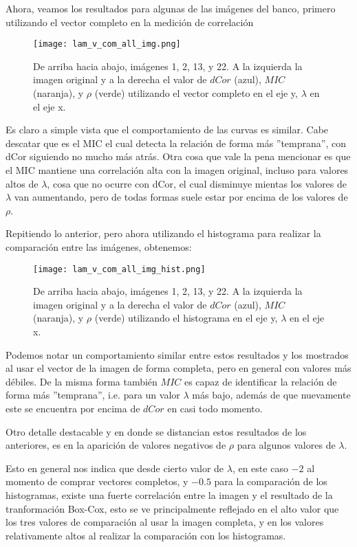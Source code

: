     Ahora, veamos los resultados para algunas de las im\'agenes del banco, primero utilizando el vector completo en la medici\'on de correlaci\'on  

    \begin{figure}[H]
        \centering
        \texttt{[image: lam\_v\_com\_all\_img.png]}
        \caption{De arriba hacia abajo, im\'agenes 1, 2, 13, y 22. A la izquierda la imagen original y a la derecha el valor de $dCor$ (azul), $MIC$ (naranja), y $\rho$ (verde) utilizando el vector completo en el eje y, $\lambda$ en el eje x.}
    \end{figure}


    Es claro a simple vista que el comportamiento de las curvas es similar. Cabe descatar que es el MIC el cual detecta la relaci\'on de forma m\'as ''temprana'', con dCor siguiendo no mucho m\'as atr\'as. Otra cosa que vale la pena mencionar es que el MIC mantiene una correlaci\'on alta con la imagen original, incluso para valores altos de $\lambda$, cosa que no ocurre con dCor, el cual disminuye mientas los valores de $\lambda$ van aumentando, pero de todas formas suele estar por encima de los valores de $\rho$.

    Repitiendo lo anterior, pero ahora utilizando el histograma para realizar la comparaci\'on entre las im\'agenes, obtenemos:

    \begin{figure}[H]
        \centering
        \texttt{[image: lam\_v\_com\_all\_img\_hist.png]}
        \caption{De arriba hacia abajo, im\'agenes 1, 2, 13, y 22. A la izquierda la imagen original y a la derecha el valor de $dCor$ (azul), $MIC$ (naranja), y $\rho$ (verde) utilizando el histograma en el eje y, $\lambda$ en el eje x.}
    \end{figure}

        Podemos notar un comportamiento similar entre estos resultados y los mostrados al usar el vector de la imagen de forma completa, pero en general con valores m\'as d\'ebiles. De la misma forma tambi\'en $MIC$ es capaz de identificar la relaci\'on de forma m\'as ''temprana'', i.e. para un valor $\lambda$ más bajo, adem\'as de que nuevamente este se encuentra por encima de $dCor$ en casi todo momento.

        Otro detalle destacable y en donde se distancian estos resultados de los anteriores, es en la aparici\'on de valores negativos de $\rho$ para algunos valores de $\lambda$. 

        Esto en general nos indica que desde cierto valor de $\lambda$, en este caso $-2$ al momento de comprar vectores completos, y $-0.5$ para la comparaci\'on de los histogramas, existe una fuerte correlaci\'on entre la imagen y el resultado de la tranformaci\'on Box-Cox, esto se ve principalmente reflejado en el alto valor que los tres valores de comparaci\'on al usar la imagen completa, y en los valores relativamente altos al realizar la comparaci\'on con los histogramas. 

